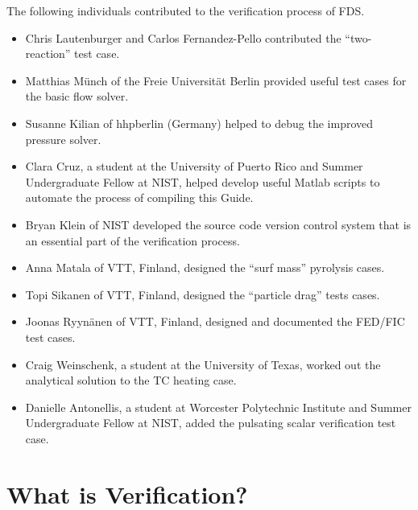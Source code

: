 \documentclass[11pt]{book}
\begin{document}
The following individuals contributed to the verification process of FDS.
\begin{itemize}
\item Chris Lautenburger and Carlos Fernandez-Pello contributed the ``two-reaction'' test case.
\item Matthias M\"{u}nch of the Freie Universit\"{a}t Berlin provided useful test cases for the basic flow solver.
\item Susanne Kilian of hhpberlin (Germany) helped to debug the improved pressure solver.
\item Clara Cruz, a student at the University of Puerto Rico and Summer Undergraduate Fellow at NIST, helped develop useful Matlab scripts to automate
the process of compiling this Guide.
\item Bryan Klein of NIST developed the source code version control system that is an essential part of the verification process.
\item Anna Matala of VTT, Finland, designed the ``surf mass'' pyrolysis cases.
\item Topi Sikanen of VTT, Finland, designed the ``particle drag'' tests cases.
\item Joonas Ryyn\"{a}nen of VTT, Finland, designed and documented the FED/FIC test cases.
\item Craig Weinschenk, a student at the University of Texas, worked out the analytical solution to the TC heating case.
\item Danielle Antonellis, a student at Worcester Polytechnic Institute and Summer Undergraduate Fellow at NIST, added the pulsating scalar verification test case.
\end{itemize}



\tableofcontents
\clearpage
\listoffigures
\clearpage
\listoftables


\mainmatter


\chapter{What is Verification?}
\end{document}
